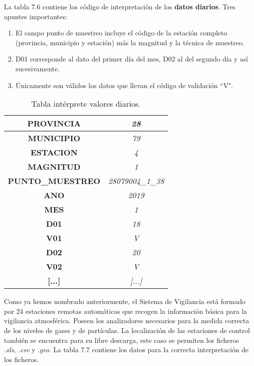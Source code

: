 La tabla 7.6 contiene los código de interpretación de los \textbf{datos diarios}. Tres apuntes importantes:

\begin{enumerate}
	\item El campo punto de muestreo incluye el código de la estación completo (provincia, municipio y estación) más la magnitud y la técnica de muestreo.
	
	\item D01 corresponde al dato del primer día del mes, D02 al del segundo día y así sucesivamente.
	
	\item Únicamente son válidos los datos que llevan el código de validación “V".
\end{enumerate}

\begin{table}[H]
	\begin{center}
		\begin{tabular}{|c|c|}
			\hline
			\textbf{PROVINCIA}       & \textit{28}              \\ \hline
			\textbf{MUNICIPIO}       & \textit{79}              \\ \hline
			\textbf{ESTACION}        & \textit{4}               \\ \hline
			\textbf{MAGNITUD}        & \textit{1}               \\ \hline
			\textbf{PUNTO\_MUESTREO} & \textit{28079004\_1\_38} \\ \hline
			\textbf{ANO}             & \textit{2019}            \\ \hline
			\textbf{MES}             & \textit{1}               \\ \hline
			\textbf{D01}             & \textit{18}              \\ \hline
			\textbf{V01}             & \textit{V}               \\ \hline
			\textbf{D02}             & \textit{20}              \\ \hline
			\textbf{V02}             & \textit{V}               \\ \hline
			\textbf{[...]}             & \textit{[...]}               \\ \hline
		\end{tabular}
	\caption{Tabla intérprete valores diarios.}
	\end{center}
\label{TablaValDiarios}
\end{table}


Como ya hemos nombrado anteriormente, el Sistema de Vigilancia está formado por 24 estaciones remotas automáticas que recogen la información básica para la vigilancia atmosférica. Poseen los analizadores necesarios para la medida correcta de los niveles de gases y de partículas. La localización de las estaciones de control también se encuentra para su libre descarga, este caso se permiten los ficheros \textit{.xls}, \textit{.csv} y \textit{.geo}. La tabla 7.7 contiene los datos para la correcta interpretación de los ficheros.


